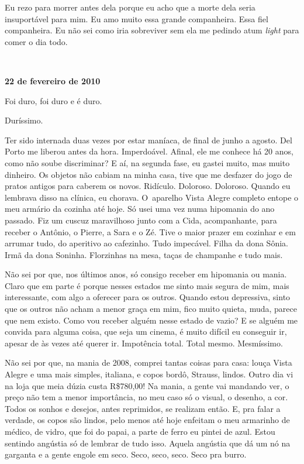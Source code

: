 Eu rezo para morrer antes dela porque eu acho que a morte dela seria
insuportável para mim. Eu amo muito essa grande companheira. Essa fiel
companheira. Eu não sei como iria sobreviver sem ela me pedindo atum
\emph{light} para comer o dia todo.

\begin{center}\asterisc{}​\end{center}

\begin{flushright}\textbf{22 de fevereiro de 2010}\end{flushright}


Foi duro, foi duro e é duro.

Duríssimo.

Ter sido internada duas vezes por estar maníaca, de final de junho a
agosto. Del Porto me liberou antes da hora. Imperdoável. Afinal, ele me
conhece há 20 anos, como não soube discriminar? E aí, na segunda fase,
eu gastei muito, mas muito dinheiro. Os objetos não cabiam na minha
casa, tive que me desfazer do jogo de pratos antigos para caberem os
novos. Ridículo. Doloroso. Doloroso. Quando eu lembrava disso na
clínica, eu chorava. O~aparelho Vista Alegre completo entope o meu
armário da cozinha até hoje. Só usei uma vez numa hipomania do ano
passado. Fiz um cuscuz maravilhoso junto com a Cida, acompanhante, para
receber o Antônio, o Pierre, a Sara e o Zé. Tive o maior prazer em
cozinhar e em arrumar tudo, do aperitivo ao cafezinho. Tudo impecável.
Filha da dona Sônia. Irmã da dona Soninha. Florzinhas na mesa, taças de
champanhe e tudo mais.

Não sei por que, nos últimos anos, só consigo receber em hipomania ou
mania. Claro que em parte é porque nesses estados me sinto mais segura
de mim, mais interessante, com algo a oferecer para os outros. Quando
estou depressiva, sinto que os outros não acham a menor graça em mim,
fico muito quieta, muda, parece que nem existo. Como vou receber alguém
nesse estado de vazio? E se alguém me convida para alguma coisa, que
seja um cinema, é muito difícil eu conseguir ir, apesar de às vezes até
querer ir. Impotência total. Total mesmo. Mesmíssimo.

Não sei por que, na mania de 2008, comprei tantas coisas para casa:
louça Vista Alegre e uma mais simples, italiana, e copos bordô, Strauss,
lindos. Outro dia vi na loja que meia dúzia custa R\$780,00! Na mania, a
gente vai mandando ver, o preço não tem a menor importância, no meu caso
só o visual, o desenho, a cor. Todos os sonhos e desejos, antes
reprimidos, se realizam então. E, pra falar a verdade, os copos são
lindos, pelo menos até hoje enfeitam o meu armarinho de médico, de
vidro, que foi do papai, a parte de ferro eu pintei de azul. Estou
sentindo angústia só de lembrar de tudo isso. Aquela angústia que dá um
nó na garganta e a gente engole em seco. Seco, seco, seco. Seco pra
burro.


